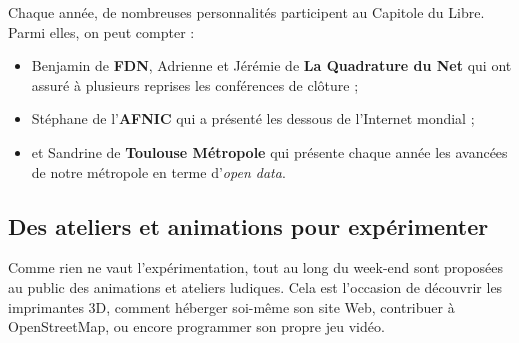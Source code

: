 Chaque année, de nombreuses personnalités participent au Capitole du Libre. Parmi elles, on peut compter :

\begin{itemize}[label=$\bullet$]
\item Benjamin  de \textbf{FDN}, Adrienne  et Jérémie  de \textbf{La Quadrature du Net} qui ont assuré à plusieurs reprises les conférences de clôture ;
\item Stéphane  de l'\textbf{AFNIC} qui a présenté les dessous de l'Internet mondial ;
\item et Sandrine  de \textbf{Toulouse Métropole} qui présente chaque année les avancées de notre métropole en terme d'\textit{open data}.
\end{itemize} 

\subsection{Des ateliers et animations pour expérimenter}

\begin{minipage}{0.6\textwidth}
Comme rien ne vaut l'expérimentation, tout au long du week-end sont 
proposées au public des animations et ateliers ludiques. Cela est 
l'occasion de découvrir les imprimantes 3D, comment héberger soi-même son 
site Web, contribuer à OpenStreetMap, ou encore programmer son propre jeu vidéo.
\end{minipage}
\begin{minipage}{0.4\textwidth}
\begin{center}
\end{center}
\end{minipage}

